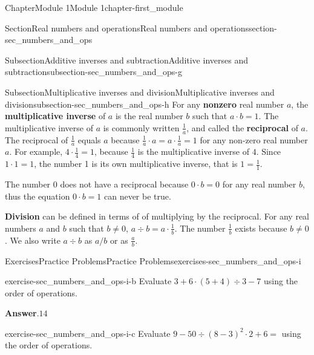 \documentclass[oneside,10pt,]{book}
\newcommand{\blocktitlefont}{\relax}
\newcommand{\terminology}[1]{\textbf{#1}}
\begin{document}
\begin{chapterptx}{Chapter}{Module 1}{}{Module 1}{}{}{chapter-first_module}
\begin{sectionptx}{Section}{Real numbers and operations}{}{Real numbers and operations}{}{}{section-sec_numbers_and_ops}
\begin{subsectionptx}{Subsection}{Additive inverses and subtraction}{}{Additive inverses and subtraction}{}{}{subsection-sec_numbers_and_ops-g}
\end{subsectionptx}
%
%
\typeout{************************************************}
\typeout{************************************************}
%
\begin{subsectionptx}{Subsection}{Multiplicative inverses and division}{}{Multiplicative inverses and division}{}{}{subsection-sec_numbers_and_ops-h}
For any \terminology{nonzero} real number \(a\), the \terminology{multiplicative inverse} of \(a\) is the real number \(b\) such that \(a \cdot b = 1\).  The multiplicative inverse of \(a\) is commonly written \(\frac{1}{a}\), and called the \terminology{reciprocal} of \(a\).  The reciprocal of \(\frac{1}{a}\) equals \(a\) because \(\frac{1}{a} \cdot a = a \cdot \frac{1}{a} = 1\) for any non-zero real number \(a\).  For example, \(4\cdot\frac{1}{4} = 1\), because \(\frac{1}{4}\) is the multiplicative inverse of \(4\).  Since \(1 \cdot 1 = 1\), the number 1 is its own multiplicative inverse, that is \(1 = \frac{1}{1}\).%
\par
The number 0 does not have a reciprocal because \(0 \cdot b = 0\) for any real number \(b\), thus the equation \(0 \cdot b = 1\) can never be true.%
\par
{}\terminology{Division} can be defined in terms of of multiplying by the reciprocal.  For any real numbers \(a\) and \(b\) such that \(b \neq 0\), \(a \div b=a \cdot \frac{1}{b}\).  The number \(\frac{1}{b}\) exists because \(b \neq 0\).  We also write \(a \div b\) as \(a / b\) or as \(\frac{a}{b}\).%
\end{subsectionptx}
%
%
\typeout{************************************************}
\typeout{************************************************}
%
\begin{exercises-subsection}{Exercises}{Practice Problems}{}{Practice Problems}{}{}{exercises-sec_numbers_and_ops-i}
\begin{divisionexercise}{1}{}{}{exercise-sec_numbers_and_ops-i-b}%
Evaluate \(3 + 6 \cdot (5 + 4) \div 3 - 7\) using the order of operations.%
\par\smallskip%
\noindent\textbf{\blocktitlefont Answer}.\hypertarget{answer-sec_numbers_and_ops-i-b-b}{}\quad{}\(14\)%
\end{divisionexercise}%
\begin{divisionexercise}{2}{}{}{exercise-sec_numbers_and_ops-i-c}%
Evaluate \(9 - 50 \div (8 - 3)^2 \cdot 2 + 6=\) using the order of operations.%

\end{divisionexercise}
\end{exercises-subsection}
\end{sectionptx}
\end{chapterptx}
\end{document}
